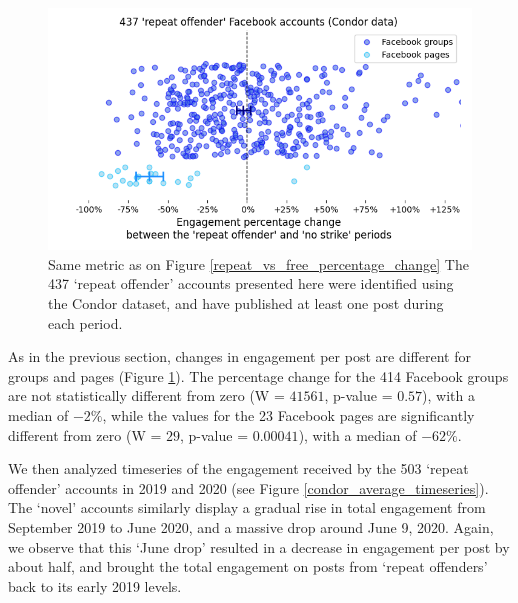 \documentclass[review]{elsarticle}
\begin{document}
\begin{figure}[!h]
\centering
\includegraphics[scale=0.5]{./../figure/condor_repeat_vs_free_percentage_change.png}
\caption{
Same metric as on Figure \ref{repeat_vs_free_percentage_change}
The 437 `repeat offender' accounts presented here were identified using the Condor dataset, and have published at least one post during each period.
}
\label{condor_repeat_vs_free_percentage_change}
\end{figure}

As in the previous section, changes in engagement per post are different for groups and pages (Figure \ref{condor_repeat_vs_free_percentage_change}).
The percentage change for the 414 Facebook groups are not statistically different from zero (W = $41561$, p-value = $0.57$), with a median of $-2\%$, while the values for the 23 Facebook pages are significantly different from zero (W = $29$, p-value = $0.00041$), with a median of $-62\%$.

We then analyzed timeseries of the engagement received by the 503 `repeat offender' accounts in 2019 and 2020 (see Figure \ref{condor_average_timeseries}).
The `novel' accounts similarly display a gradual rise in total engagement from September 2019 to June 2020, and a massive drop around June 9, 2020.
Again, we observe that this `June drop' resulted in a decrease in engagement per post by about half, and brought the total engagement on posts from ‘repeat offenders’ back to its early 2019 levels.
\end{document}
